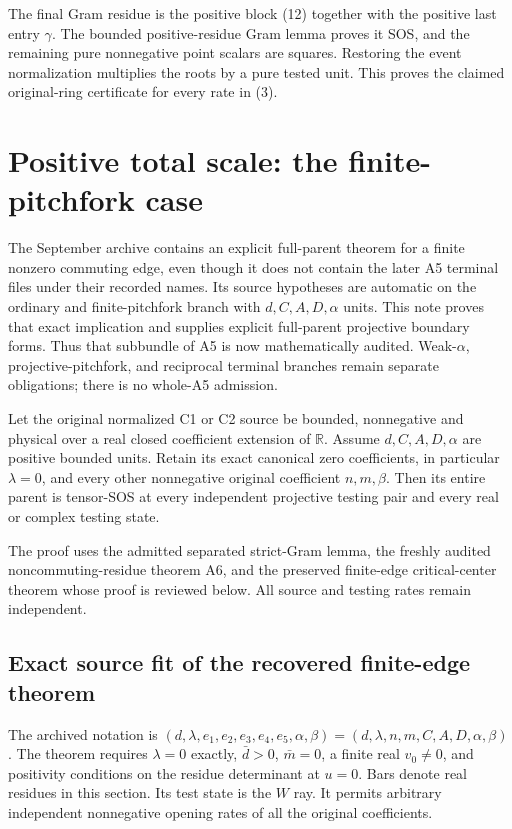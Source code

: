 The final Gram residue is the positive block (12) together with the
positive last entry \(\gamma\). The bounded positive-residue Gram lemma
proves it SOS, and the remaining pure nonnegative point scalars are
squares. Restoring the event normalization multiplies the roots by a
pure tested unit. This proves the claimed original-ring certificate for
every rate in (3).



\section{\texorpdfstring{Positive total scale: the finite-pitchfork case}{Positive total scale: the finite-pitchfork case}}
\label{component:pfb0cf454f653}


The September archive contains an explicit full-parent theorem for a
finite nonzero commuting edge, even though it does not contain the later
A5 terminal files under their recorded names. Its source hypotheses are
automatic on the ordinary and finite-pitchfork branch with
$d,C,A,D,\alpha$ units. This note proves that exact implication and
supplies explicit full-parent projective boundary forms. Thus that
subbundle of A5 is now mathematically audited. Weak-$\alpha$,
projective-pitchfork, and reciprocal terminal branches remain separate
obligations; there is no whole-A5 admission.

\begin{theorem}
Let the original normalized C1 or C2 source be bounded, nonnegative and
physical over a real closed coefficient extension of $\mathbb R$.
Assume $d,C,A,D,\alpha$ are positive bounded units. Retain its exact
canonical zero coefficients, in particular $\lambda=0$, and every
other nonnegative original coefficient $n,m,\beta$. Then its entire
parent is tensor-SOS at every independent projective testing pair and
every real or complex testing state.
\end{theorem}

The proof uses the admitted separated strict-Gram lemma, the freshly
audited noncommuting-residue theorem A6, and the preserved finite-edge
critical-center theorem whose proof is reviewed below. All source and
testing rates remain independent.

\subsection*{Exact source fit of the recovered finite-edge theorem}

The archived notation is
$(d,\lambda,e_1,e_2,e_3,e_4,e_5,\alpha,\beta)
=(d,\lambda,n,m,C,A,D,\alpha,\beta)$.
The theorem requires $\lambda=0$ exactly, $\bar d>0$, $\bar m=0$,
a finite real $v_0\ne0$, and positivity conditions on the residue
determinant at $u=0$. Bars denote real residues in this section.
Its test state is the $W$ ray. It permits arbitrary independent
nonnegative opening rates of all the original coefficients.

